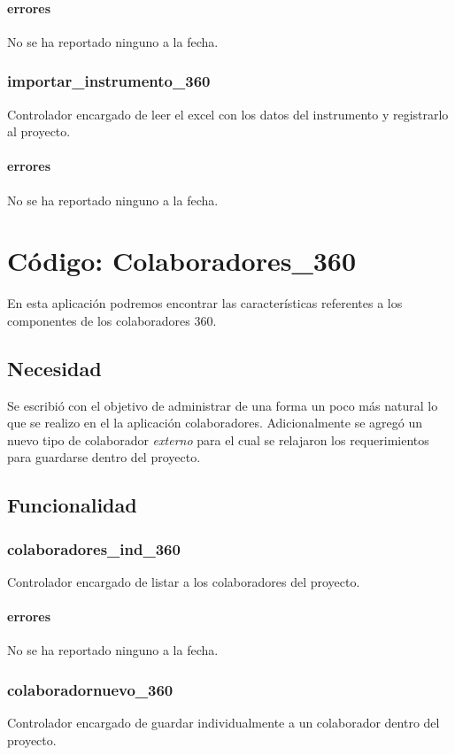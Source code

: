 \documentclass[10pt,a4paper]{book}
\begin{document}
	\subsubsection{errores}
	No se ha reportado ninguno a la fecha.
	
	\subsection{importar\_instrumento\_360}
	Controlador encargado de leer el excel con los datos del instrumento y registrarlo al proyecto.
	\subsubsection{errores}
	No se ha reportado ninguno a la fecha.


	\chapter{Código: Colaboradores\_360}
	
	En esta aplicación podremos encontrar las características referentes a los componentes de los colaboradores 360.
	
	\section{Necesidad}
	
	Se escribió con el objetivo de administrar de una forma un poco más natural lo que se realizo en el la aplicación colaboradores. Adicionalmente se agregó un nuevo tipo de colaborador \textit{externo} para el cual se relajaron los requerimientos para guardarse dentro del proyecto.

	\section{Funcionalidad}


	\subsection{colaboradores\_ind\_360}
	Controlador encargado de listar a los colaboradores del proyecto.
	\subsubsection{errores}
	No se ha reportado ninguno a la fecha.
	
	\subsection{colaboradornuevo\_360}
	Controlador encargado de guardar individualmente a un colaborador dentro del proyecto.
\end{document}
